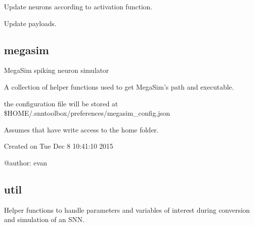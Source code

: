 \documentclass[letterpaper,10pt,english]{sphinxmanual}
\begin{document}

\begin{fulllineitems}
\label{core:core.inisim.update_neurons}
Update neurons according to activation function.

\end{fulllineitems}


\begin{fulllineitems}
\label{core:core.inisim.update_payload}
Update payloads.

\end{fulllineitems}



\subsection{megasim}
\label{core:module-core.megasim}\label{core:megasim}
MegaSim spiking neuron simulator

A collection of helper functions used to get MegaSim's path and executable.

the configuration file will be stored at \$HOME/.snntoolbox/preferences/megasim\_config.json

Assumes that have write access to the home folder.

Created on Tue Dec  8 10:41:10 2015

@author: evan

\begin{fulllineitems}
\label{core:core.megasim.megasim_path}
\end{fulllineitems}



\subsection{util}
\label{core:util}\label{core:module-core.util}
Helper functions to handle parameters and variables of interest during
conversion and simulation of an SNN.
\end{document}
